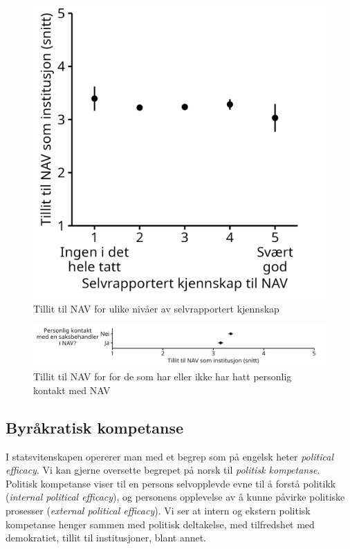 \documentclass[
  12pt,
  a4paper, 12pt]{article}
\begin{document}
\begin{figure}

{\centering \includegraphics[width=0.6\linewidth]{figs/png/fig_nav_trust_by_nav_knowledge} 

}

\caption{Tillit til NAV for ulike nivåer av selvrapportert kjennskap}\label{fig:unnamed-chunk-7}
\end{figure}

\begin{figure}

{\centering \includegraphics[width=1\linewidth]{figs/png/fig_nav_trust_by_nav_personal_contact} 

}

\caption{Tillit til NAV for for de som har eller ikke har hatt personlig kontakt med NAV}\label{fig:unnamed-chunk-8}
\end{figure}

\hypertarget{byruxe5kratisk-kompetanse}{%
\subsection{Byråkratisk kompetanse}\label{byruxe5kratisk-kompetanse}}

I statsvitenskapen opererer man med et begrep som på engelsk heter \emph{political efficacy}.
Vi kan gjerne oversette begrepet på norsk til \emph{politisk kompetanse}.
Politisk kompetanse viser til en persons selvopplevde evne til å forstå politikk (\emph{internal political efficacy}), og personens opplevelse av å kunne påvirke politiske prosesser (\emph{external political efficacy}).
Vi ser at intern og ekstern politisk kompetanse henger sammen med politisk deltakelse, med tilfredshet med demokratiet, tillit til institusjoner, blant annet.
\end{document}
